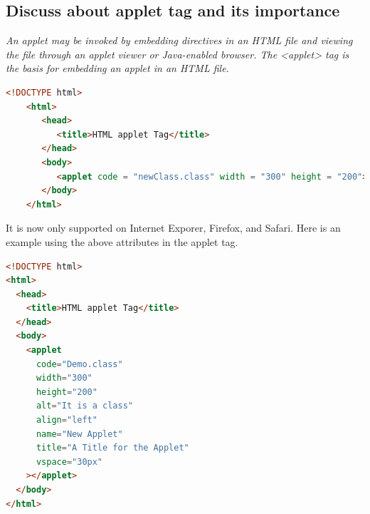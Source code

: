 \documentclass[11pt]{article}
\begin{document}
\subsection{Discuss about applet tag and its importance}
\textit{An applet may be invoked by embedding directives in an HTML file and viewing the file through an applet viewer or Java-enabled browser.
	The <applet> tag is the basis for embedding an applet in an HTML file.}
\begin{lstlisting}[language=HTML]
	<!DOCTYPE html>
	<html>
	   <head>
		  <title>HTML applet Tag</title>
	   </head>
	   <body>
		  <applet code = "newClass.class" width = "300" height = "200"></applet>
	   </body>
	</html>
\end{lstlisting}
It is now only supported on Internet Exporer, Firefox, and Safari.
Here is an example using the above attributes in the applet tag.

\begin{lstlisting}[language=HTML]
<!DOCTYPE html>
<html>
  <head>
    <title>HTML applet Tag</title>
  </head>
  <body>
    <applet
      code="Demo.class"
      width="300"
      height="200"
      alt="It is a class"
      align="left"
      name="New Applet"
      title="A Title for the Applet"
      vspace="30px"
    ></applet>
  </body>
</html>

\end{lstlisting}
\end{document}
